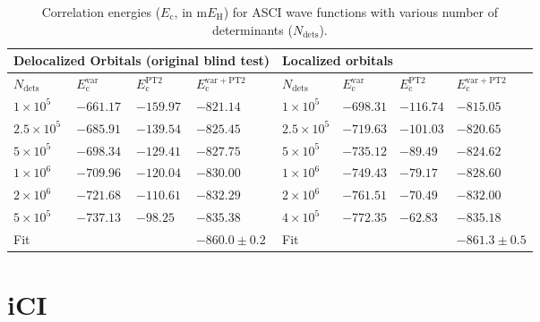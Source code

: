 \documentclass[journal=jcp,manuscript=suppinfo]{achemso}
\begin{document}
\begin{table}[]
	\begin{tabular}{llll|llll}
		\toprule
		\multicolumn{4}{l}{Delocalized Orbitals (original blind test)} & \multicolumn{4}{l}{Localized orbitals}             \\\hline
		$N_\text{dets}$      & $E_{\mathrm{c}}^{\mathrm{var}}$    & $E_{\mathrm{c}}^{\mathrm{PT2}}$      & $E_{\mathrm{c}}^{\mathrm{var+PT2}}$    & $N_\text{dets}$    & $E_{\mathrm{c}}^{\mathrm{var}}$ & $E_{\mathrm{c}}^{\mathrm{PT2}}$   & $E_{\mathrm{c}}^{\mathrm{var+PT2}}$ \\
		\midrule\midrule
		$1\times10^5$  & $-661.17$        & $-159.97$    & $-821.14$            & $1\times10^5$ & $-698.31$     & $-116.74$ & $-815.05$         \\
		$2.5\times10^5$    & $-685.91$        & $-139.54$    & $-825.45$            & $2.5\times10^5$ & $-719.63$     & $-101.03$ & $-820.65$         \\
		$5\times10^5$    & $-698.34$        & $-129.41$    & $-827.75$            & $5\times10^5$ & $-735.12$     & $-89.49$  & $-824.62$         \\
		$1\times10^6$    & $-709.96$        & $-120.04$    & $-830.00$            & $1\times10^6$ & $-749.43$     & $-79.17$  & $-828.60$         \\
		$2\times10^6$    & $-721.68$        & $-110.61$    & $-832.29$            & $2\times10^6$ & $-761.51$     & $-70.49$  & $-832.00$         \\
		$5\times10^5$    & $-737.13$        & $-98.25$     & $-835.38$            & $4\times10^5$ & $-772.35$     & $-62.83$  & $-835.18$         \\\hline 
		Fit         &                &            & $-860.0\pm0.2$            & Fit      &             &         & $-861.3\pm0.5$ \\
		\midrule
	\end{tabular}
	\caption{Correlation energies  ($E_{\mathrm{c}}$, in m$E_{\text{H}}$) for ASCI wave functions with various number of determinants ($N_\text{dets}$).}
	\label{tab:ascidata}
	\vspace{-0.6cm}
\end{table}

\section{iCI}
\end{document}
